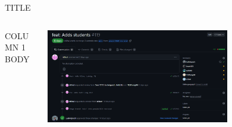 




\begin{frame}{TITLE}
    \begin{columns}
        \begin{column}{0.5\textwidth}
            COLUMN 1 BODY
        \end{column}
        \begin{column}{0.5\textwidth}
            \includegraphics[height=0.7\textheight,width=0.7\textwidth,keepaspectratio]{images/web_students.png}
        \end{column}
    \end{columns}
\end{frame}
